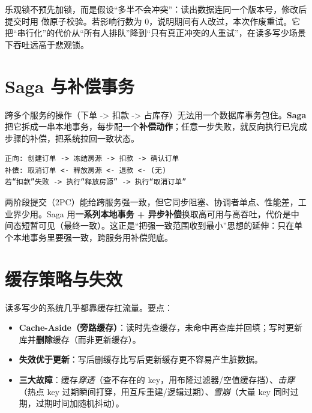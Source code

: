 \begin{idea}
乐观锁不预先加锁，而是假设“多半不会冲突”：读出数据连同一个版本号，修改后提交时用  做原子校验。若影响行数为 0，说明期间有人改过，本次作废重试。它把“串行化”的代价从“所有人排队”降到“只有真正冲突的人重试”，在读多写少场景下吞吐远高于悲观锁。
\end{idea}

\section{Saga 与补偿事务}

跨多个服务的操作（下单 -> 扣款 -> 占库存）无法用一个数据库事务包住。\textbf{Saga} 把它拆成一串本地事务，每步配一个\textbf{补偿动作}；任意一步失败，就反向执行已完成步骤的补偿，把系统拉回一致状态。

\begin{lstlisting}
正向: 创建订单 -> 冻结房源 -> 扣款 -> 确认订单
补偿: 取消订单 <- 释放房源 <- 退款 <- (无)
若“扣款”失败 -> 执行“释放房源” -> 执行“取消订单”
\end{lstlisting}

\begin{idea}
两阶段提交（2PC）能给跨服务强一致，但它同步阻塞、协调者单点、性能差，工业界少用。Saga 用\textbf{一系列本地事务 + 异步补偿}换取高可用与高吞吐，代价是中间态短暂可见（最终一致）。这正是“把强一致范围收到最小”思想的延伸：只在单个本地事务里要强一致，跨服务用补偿兜底。
\end{idea}

\section{缓存策略与失效}

读多写少的系统几乎都靠缓存扛流量。要点：

\begin{itemize}
  \item \textbf{Cache-Aside（旁路缓存）}：读时先查缓存，未命中再查库并回填；写时更新库并\textbf{删除}缓存（而非更新缓存）。
  \item \textbf{失效优于更新}：写后删缓存比写后更新缓存更不容易产生脏数据。
  \item \textbf{三大故障}：缓存\emph{穿透}（查不存在的 key，用布隆过滤器/空值缓存挡）、\emph{击穿}（热点 key 过期瞬间打穿，用互斥重建/逻辑过期）、\emph{雪崩}（大量 key 同时过期，过期时间加随机抖动）。
\end{itemize}

